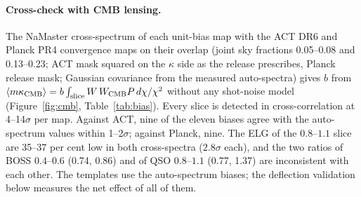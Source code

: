 \documentclass[11pt,a4paper]{article}
\newcommand{\kc}{\kappa_{\rm CMB}}
\begin{document}
\paragraph{Cross-check with CMB lensing.} The NaMaster cross-spectrum of each unit-bias map with the ACT DR6 and Planck PR4 convergence maps on their overlap (joint sky fractions 0.05--0.08 and 0.13--0.23; ACT mask squared on the $\kappa$ side as the release prescribes, Planck release mask; Gaussian covariance from the measured auto-spectra) gives $b$ from $\langle m\kc\rangle=b\int_{\rm slice}W\,W_{\rm CMB}P\,d\chi/\chi^2$ without any shot-noise model (Figure~\ref{fig:cmb}, Table~\ref{tab:bias}). Every slice is detected in cross-correlation at 4--14$\sigma$ per map. Against ACT, nine of the eleven biases agree with the auto-spectrum values within 1--2$\sigma$; against Planck, nine. The ELG of the $0.8$--$1.1$ slice are 35--37 per cent low in both cross-spectra ($2.8\sigma$ each), and the two ratios of BOSS $0.4$--$0.6$ (0.74, 0.86) and of QSO $0.8$--$1.1$ (0.77, 1.37) are inconsistent with each other. The templates use the auto-spectrum biases; the deflection validation below measures the net effect of all of them.
\end{document}
